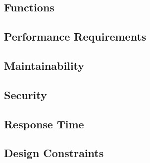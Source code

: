 \documentclass{article}
\begin{document}
\subsection{Functions}
\subsection{Performance Requirements}
\subsection{Maintainability}
\subsection{Security}
\subsection{Response Time}
\subsection{Design Constraints}

%
%

\end{document}
